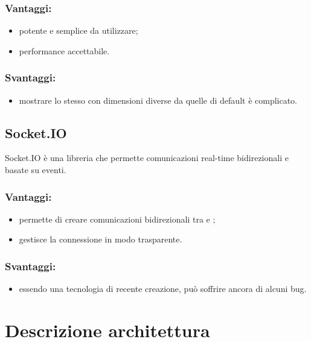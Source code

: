 \documentclass[a4paper, titlepage]{article}
\begin{document}
\subsubsection{Vantaggi:}

\begin{itemize}
	\item potente e semplice da utilizzare;
	\item performance accettabile.
\end{itemize}

\subsubsection{Svantaggi:}
\begin{itemize}
	\item mostrare lo stesso  con dimensioni diverse da quelle di default è complicato.
\end{itemize}



\subsection{Socket.IO}
Socket.IO è una libreria  che permette comunicazioni real-time bidirezionali e basate su eventi.

\subsubsection{Vantaggi:}

\begin{itemize}
	\item permette di creare comunicazioni bidirezionali tra  e ;
	\item gestisce la connessione in modo trasparente.
\end{itemize}

\subsubsection{Svantaggi:}

\begin{itemize}
	\item essendo una tecnologia di recente creazione, può soffrire ancora di alcuni bug.
\end{itemize}

\newpage
	\section{Descrizione architettura}
\end{document}
